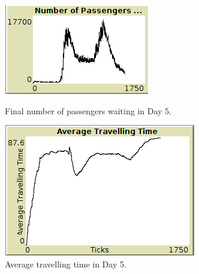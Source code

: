 \begin{figure}[htbp]
\centering
\begin{minipage}{.48\textwidth}
  \includegraphics[width=\linewidth]{src/nr_pass_waiting5.png}
  \caption{\label{fig:pass_waiting5}Final number of passengers waiting in Day 5.}
\end{minipage}%
\begin{minipage}{.48\textwidth}
  \includegraphics[width=\linewidth]{src/avg_tt5.png}
  \caption{\label{fig:avg_tt5}Average travelling time in Day 5.}
\end{minipage}
\end{figure}
